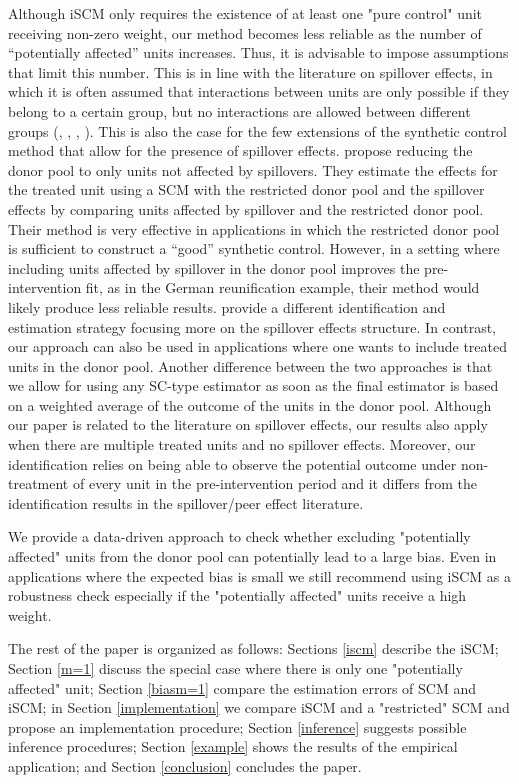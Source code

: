 Although iSCM only requires the existence of at least one "pure control" unit receiving non-zero weight,  our method becomes less reliable as the number of ``potentially affected'' units increases. Thus, it is advisable to impose assumptions that limit this number. This is in line with the literature on spillover effects, in which it is often assumed that interactions between units are only possible if they belong to a certain group, but no interactions are allowed between different groups (\citealt{Cer2017},  \citealt{For2018}, \citealt{Hub2019},  \citealt{Vaz2017}). This is also the case for the few extensions of the synthetic control method that allow for the presence of spillover effects.  \cite{Mar2019} propose reducing the donor pool to only units not affected by spillovers. They estimate the effects for the treated unit using a SCM with the restricted donor pool and the spillover effects by comparing units affected by spillover and the restricted donor pool. Their method is very effective in applications in which the restricted donor pool is sufficient to construct a ``good'' synthetic control. However, in a setting where including units affected by spillover in the donor pool improves the pre-intervention fit, as in the German reunification example, their method would likely produce less reliable results. \cite{Cao2019} provide a different identification and estimation strategy focusing more on the spillover effects structure.  In contrast, our approach can also be used in applications where one wants to include treated units in the donor pool. Another difference between the two approaches is that we allow for using any SC-type estimator as soon as the final estimator is based on a weighted average of the outcome of the units in the donor pool. Although our paper is related to the literature on spillover effects, our results also apply when there are multiple treated units and no spillover effects. Moreover, our identification relies on being able to observe the potential outcome under non-treatment of every unit in the pre-intervention period and it differs from the identification results in the spillover/peer effect literature.

We provide a data-driven approach to check whether excluding "potentially affected" units from the donor pool can potentially lead to a large bias. Even in applications where the expected bias is small we still recommend using iSCM as a robustness check especially if the "potentially affected" units receive a high weight. 

The rest of the paper is organized as follows: 
Sections \ref{iscm} describe the iSCM; Section \ref{m=1} discuss the special case where there is only one "potentially affected" unit; Section \ref{biasm=1} compare the estimation errors of SCM and iSCM; in Section \ref{implementation} we compare iSCM and a "restricted" SCM and propose an implementation procedure; Section \ref{inference} suggests possible inference procedures; Section \ref{example} shows the results of the empirical application; and Section \ref{conclusion} concludes the paper.

